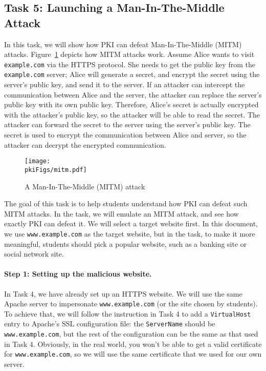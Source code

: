\subsection{Task 5: Launching a Man-In-The-Middle Attack}

In this task, we will show how PKI can defeat Man-In-The-Middle (MITM) attacks. 
Figure~\ref{pki:fig:mitm} depicts how MITM attacks work. 
Assume Alice wants to visit \texttt{example.com} via the HTTPS protocol. She 
needs to get the public key from the \texttt{example.com} server; Alice will 
generate a secret, and encrypt the secret using the server's public key,
and send it to the server. 
If an attacker can
intercept the communication between Alice and the server, the attacker 
can replace the server's public key with its own public key. Therefore, Alice's secret is
actually encrypted with the attacker's public key, so the attacker
will be able to read the secret. The attacker can forward the secret to the server using the
server's public key. The secret is used to encrypt the communication between Alice and server,  
so the attacker can decrypt the encrypted communication. 


\begin{figure}[htb]
   \begin{center}
      \texttt{[image: \\pkiFigs/mitm.pdf]}
   \end{center}
   \caption{A Man-In-The-Middle (MITM) attack}
   \label{pki:fig:mitm}
\end{figure}



The goal of this task is to help students understand how PKI can defeat such MITM attacks. 
In the task, we will emulate an MITM attack, and see how exactly PKI can defeat it.
We will select a target website first. In this document, we use 
\texttt{www.example.com} as the target website, but in the task, to make it more meaningful,
students should pick a popular website, such as a banking site or social network site.


\paragraph{Step 1: Setting up the malicious website.} 
In Task 4, we have already set up an HTTPS website. We will
use the same Apache server to impersonate \texttt{www.example.com} (or the site chosen by students).  
To achieve that, we will follow the instruction in Task 4 to 
add a \texttt{VirtualHost} entry to Apache's SSL configuration file: the
\texttt{ServerName} should be \texttt{www.example.com}, but the rest of the
configuration can be the same as that used in Task 4. Obviously, in the real world,
you won't be able to get a valid certificate for \texttt{www.example.com}, 
so we will use the same certificate that we used for our own server. 


